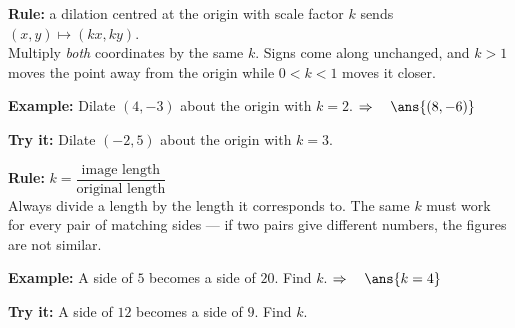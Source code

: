 \documentclass[12pt]{article}
\begin{document}


\begin{formulabox}
\textbf{Rule:} a dilation centred at the origin with scale factor $k$ sends
$(x, y) \mapsto (kx, ky)$.\\[3pt]
Multiply \textit{both} coordinates by the same $k$. Signs come along unchanged, and $k > 1$
moves the point away from the origin while $0 < k < 1$ moves it closer.
\end{formulabox}

\begin{examplebox}
\textbf{Example:} \quad Dilate $(4, -3)$ about the origin with $k = 2$.
$\Rightarrow\quad \ans{(8, -6)}$
\end{examplebox}

\begin{tryitbox}
\textbf{Try it:} \quad Dilate $(-2, 5)$ about the origin with $k = 3$.\\[2pt]
\end{tryitbox}


\begin{formulabox}
\textbf{Rule:} \quad $k = \dfrac{\text{image length}}{\text{original length}}$\\[3pt]
Always divide a length by the length it corresponds to. The same $k$ must work for every pair of
matching sides --- if two pairs give different numbers, the figures are not similar.
\end{formulabox}

\begin{examplebox}
\textbf{Example:} \quad A side of $5$ becomes a side of $20$. Find $k$.
$\Rightarrow\quad \ans{k = 4}$
\end{examplebox}

\begin{tryitbox}
\textbf{Try it:} \quad A side of $12$ becomes a side of $9$. Find $k$.\\[2pt]
\end{tryitbox}
\end{document}
